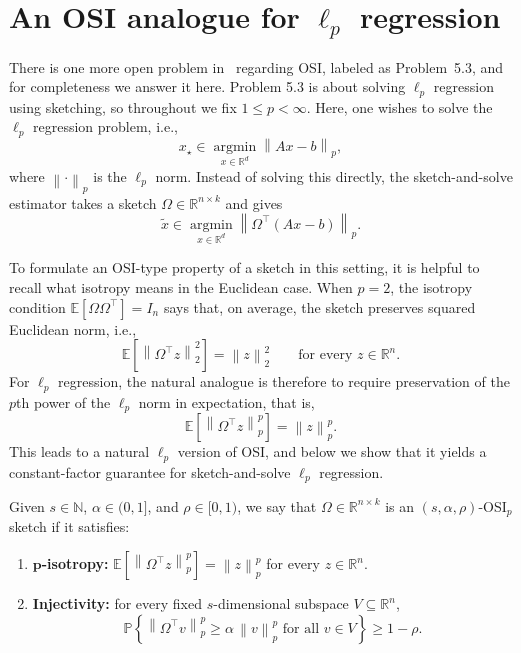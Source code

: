 \documentclass[onefignum,onetabnum]{siamart251216}
\newcommand{\R}{\mathbb{R}}
\newcommand{\E}{\mathbb{E}}
\newcommand{\Prob}{\mathbb{P}}
\newcommand{\norm}[1]{\left\lVert #1 \right\rVert}
\newcommand{\argmin}{\operatorname*{argmin}}
\begin{document}
\section{An OSI analogue for $\ell_p$ regression}\label{sec:lp}
There is one more open problem in~\cite{AmselEtAl2026} regarding OSI,  labeled as Problem~5.3, and for completeness we answer it here.  Problem 5.3 is about solving $\ell_p$ regression using sketching,  so throughout we fix $1\le p<\infty$.  Here, one wishes to solve the $\ell_p$ regression problem, i.e., 
\[
x_\star \in \argmin_{x\in\R^d} \norm{A x - b}_p,
\]
where $\norm{\cdot}_p$ is the $\ell_p$ norm.  Instead of solving this directly, the sketch-and-solve estimator takes a sketch $\Omega\in\R^{n\times k}$ and gives 
\[
\widetilde x \in \argmin_{x\in\R^d} \norm{\Omega^\top(A x - b)}_p. 
\]

To formulate an OSI-type property of a sketch in this setting, it is helpful to recall what isotropy means in the Euclidean case. When $p=2$, the isotropy condition $\E[\Omega\Omega^\top]=I_n$ says that, on average, the sketch preserves squared Euclidean norm, i.e., 
\[
\E\!\left[\norm{\Omega^\top z}_2^2\right]=\norm{z}_2^2
\qquad \text{for every } z\in\R^n.
\]
For $\ell_p$ regression, the natural analogue is therefore to require preservation of the $p$th power of the $\ell_p$ norm in expectation, that is,
\[
\E\!\left[\norm{\Omega^\top z}_p^p\right]=\norm{z}_p^p.
\] 
This leads to a natural $\ell_p$ version of OSI, and below we show that it yields a constant-factor guarantee for sketch-and-solve $\ell_p$ regression.  

\begin{definition}
Given $s\in\mathbb{N}$, $\alpha\in(0,1]$, and $\rho\in[0,1)$,  we say that $\Omega\in\R^{n\times k}$ is an $(s,\alpha,\rho)$-OSI${}_p$ sketch if it satisfies: 
\begin{enumerate}[label=(\roman*),leftmargin=1.8em]
    \item \textbf{$\mathbf{p}$-isotropy:} $\E\left[\norm{\Omega^\top z}_p^p\right] = \norm{z}_p^p$ for every $z\in\R^n.$
    \item \textbf{Injectivity:} for every fixed $s$-dimensional subspace $V\subseteq\R^n$,
\[
\Prob\!\left\{ \norm{\Omega^\top v}_p^p \ge \alpha\,\norm{v}_p^p \text{ for all } v\in V \right\} \ge 1-\rho.
\]
\end{enumerate}
\end{definition}
\end{document}
